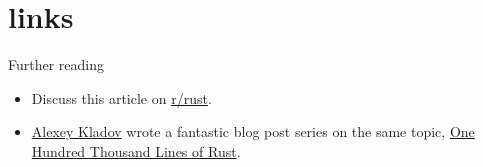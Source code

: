 \documentclass{article}
\begin{document}
\section{links}{Further reading}

\begin{itemize}
  \item
    Discuss this article on \href{https://www.reddit.com/r/rust/comments/s818q3/blog_post_rust_at_scale_packages_crates_and/}{r/rust}.
  \item
    \href{https://github.com/matklad}{Alexey Kladov} wrote a fantastic blog post series on the same topic, \href{https://matklad.github.io/2021/09/05/Rust100k.html}{One Hundred Thousand Lines of Rust}.
\end{itemize}
\end{document}
